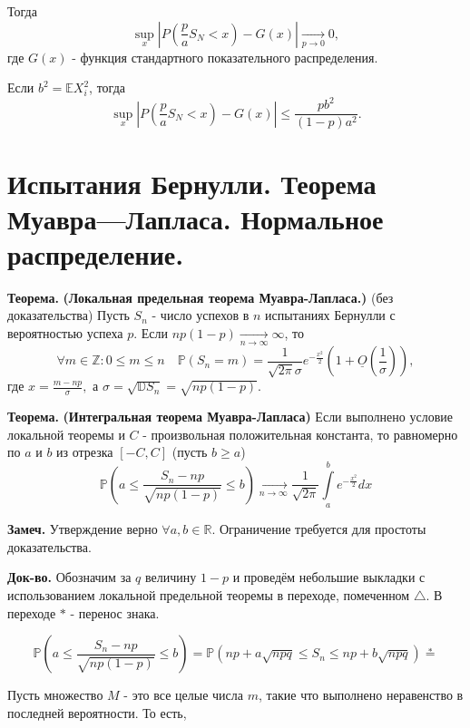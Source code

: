 \documentclass[oneside,final,14pt]{extreport}
\newcommand\mynote{{\bf Замеч.}}
\newcommand\myth{{\bf Теорема.}}
\newcommand\myqed{{\bf Док-во.}}
\theoremstyle{definition}
\begin{document}
Тогда $$\sup _{x}\left|P\left(\frac{p}{a} S_{N}<x\right)-G(x)\right| \underset{p \rightarrow 0}{\longrightarrow} 0,$$
где $G(x)$ - функция стандартного показательного распределения.

Если $b^2 = \mathbb{E}X_i^2$, тогда $$\sup_{x}\left|P\left(\frac{p}{a} S_{N}<x\right)-G(x)\right| \leqslant \frac{p b^{2}}{(1-p) a^{2}}.$$
 
\section{Испытания Бернулли. Теорема Муавра—Лапласа. Нормальное распределение.}

\myth{} \textbf{(Локальная предельная теорема Муавра-Лапласа.)} (без доказательства) Пусть $S_n$ - число успехов в $n$ испытаниях Бернулли с вероятностью успеха $p$. Если $n p(1-p) \underset{n \to \infty}{\longrightarrow} \infty$, то
$$\forall m \in \mathbb{Z}: 0 \leqslant m \leqslant n \quad \mathbb{P}\left(S_{n}=m\right)=\frac{1}{\sqrt{2 \pi} \sigma} e^{-\frac{x^{2}}{2}}\left(1+\underline{O}\left(\frac{1}{\sigma}\right)\right),$$
где $x = \frac{m - np}{\sigma},$ а $\sigma=\sqrt{\mathbb{D} S_{n}}=\sqrt{n p(1-p)}$.

\myth{} \textbf{(Интегральная теорема Муавра-Лапласа)} Если выполнено условие локальной теоремы и $C$ - произвольная положительная константа, то равномерно по $a$ и $b$ из отрезка $[-C,C]$ (пусть $b \geqslant a$)
$$\mathbb{P}\left(a \leqslant \frac{S_{n}-n p}{\sqrt{n p(1-p)}} \leqslant b\right) \underset{n \to \infty}{\longrightarrow} \frac{1}{\sqrt{2 \pi}} \int\limits_{a}^{b} e^{-\frac{x^{2}}{2}} d x$$

\mynote{} Утверждение верно $\forall a,b \in \mathbb{R}$. Ограничение требуется для простоты доказательства.

\myqed{} Обозначим за $q$ величину $1 - p$ и проведём небольшие выкладки с использованием локальной предельной теоремы в переходе, помеченном $\triangle$. В переходе $*$ - перенос знака.

$$\mathbb{P}\left(a \leqslant \frac{S_{n}-n p}{\sqrt{n p(1-p)}} \leqslant b\right)=\mathbb{P}\left(n p+a \sqrt{n p q} \leqslant S_{n} \leqslant n p+b \sqrt{n p q}\right) \stackrel{*}{=}$$

Пусть множество $M$ - это все целые числа $m$, такие что выполнено неравенство в последней вероятности. То есть,
\end{document}
